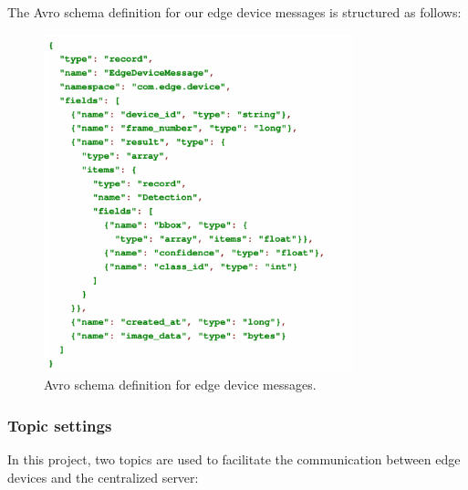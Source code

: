 The Avro schema definition for our edge device messages is structured as follows:

\newpage

\begin{figure}[htbp]
    \centering
    \includegraphics[width=0.8\textwidth]{Figure/avro_def.png}
    \caption{Avro schema definition for edge device messages.}
    \label{fig:avro_schema}
\end{figure}


\subsubsection{Topic settings}

In this project, two topics are used to facilitate the communication between edge devices and the centralized server:

